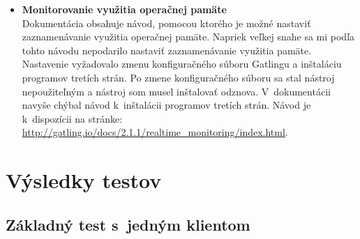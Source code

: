 \documentclass[12pt,oneside,final]{fithesis-utf8}
\begin{document}
\begin{itemize}

\hypertarget{gatling_memory}{}
\item \textbf{Monitorovanie využitia operačnej pamäte}\\
Dokumentácia obsahuje návod, pomocou ktorého je možné nastaviť zaznamenávanie využitia operačnej pamäte. Napriek veľkej snahe sa mi podľa tohto návodu nepodarilo nastaviť zaznamenávanie využitia pamäte. Nastavenie vyžadovalo zmenu konfiguračného súboru Gatlingu a inštaláciu programov tretích strán. Po zmene konfiguračného súboru sa stal nástroj nepoužiteľným a nástroj som musel inštalovať odznova. V~dokumentácii navyše chýbal návod k~inštalácii programov tretích strán. Návod je k~dispozícii na stránke: \url{http://gatling.io/docs/2.1.1/realtime_monitoring/index.html}.

\end{itemize}

\section{Výsledky testov}

\subsection{Základný test s~jedným klientom}
\end{document}
